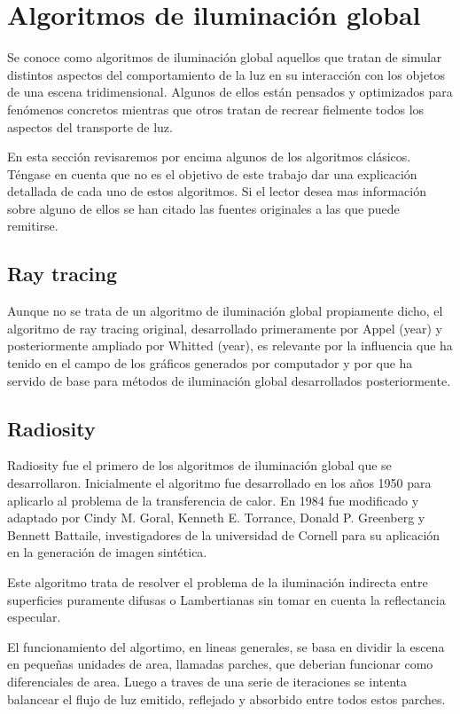 \section{Algoritmos de iluminación global}

Se conoce como algoritmos de iluminación global aquellos que tratan de simular distintos aspectos del comportamiento de la luz en su interacción con los objetos de una escena tridimensional. Algunos de ellos están pensados y optimizados para fenómenos concretos mientras que otros tratan de recrear fielmente todos los aspectos del transporte de luz.

\medskip
En esta sección revisaremos por encima algunos de los algoritmos clásicos. Téngase en cuenta que no es el objetivo de este trabajo dar una explicación detallada de cada uno de estos algoritmos. Si el lector desea mas información sobre alguno de ellos se han citado las fuentes originales a las que puede remitirse.

\subsection{Ray tracing}

Aunque no se trata de un algoritmo de iluminación global propiamente dicho, el algoritmo de ray tracing original, desarrollado primeramente por Appel (year) y posteriormente ampliado por Whitted (year), es relevante por la influencia que ha tenido en el campo de los gráficos generados por computador y por que ha servido de base para métodos de iluminación global desarrollados posteriormente. 

 
\subsection{Radiosity}

Radiosity fue el primero de los algoritmos de iluminación global que se desarrollaron. Inicialmente el algoritmo fue desarrollado en los años 1950 para aplicarlo al problema de la transferencia de calor. En 1984 fue modificado y adaptado por \nocite{Goral1984} Cindy M. Goral, Kenneth E. Torrance, Donald P. Greenberg y Bennett Battaile, investigadores de la universidad de Cornell para su aplicación en la generación de imagen sintética.

\medskip
Este algoritmo trata de resolver el problema de la iluminación indirecta entre superficies puramente difusas o Lambertianas sin tomar en cuenta la reflectancia especular.

\medskip
El funcionamiento del algortimo, en lineas generales, se basa en dividir la escena en pequeñas unidades de area, llamadas parches, que deberian funcionar como diferenciales de area. Luego a traves de una serie de iteraciones se intenta balancear el flujo de luz emitido, reflejado y absorbido entre todos estos parches.

